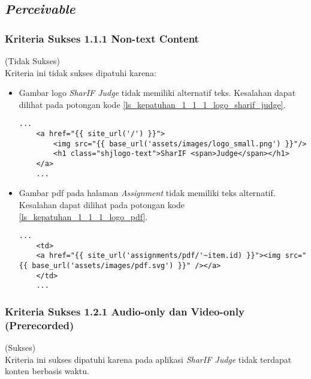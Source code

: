 \subsection{\textit{Perceivable}}
\label{subsec:kepatuhan_perceivable}

\subsubsection{Kriteria Sukses 1.1.1 Non-text Content}
\label{subsubsec:kepatuhan_kriteria_1.1.1}
(Tidak Sukses) \\

Kriteria ini tidak sukses dipatuhi karena:
\begin{itemize}
	\item Gambar logo \textit{SharIF Judge} tidak memiliki alternatif teks. Kesalahan dapat dilihat pada potongan kode \ref{ls_kepatuhan_1_1_1_logo_sharif_judge}.
	\begin{lstlisting}[basicstyle=\ttfamily, frame=single,
	columns=fullflexible, keepspaces=true, breaklines=true, label=ls_kepatuhan_1_1_1_logo_sharif_judge, caption=Kriteria Sukses 1.1.1 - Logo SharIF Judge Tidak Diberi Teks Alternatif]
	...
	<a href="{{ site_url('/') }}">
		<img src="{{ base_url('assets/images/logo_small.png') }}"/>
		<h1 class="shjlogo-text">SharIF <span>Judge</span></h1>
	</a>
	...
	\end{lstlisting}
	\item Gambar pdf pada halaman \textit{Assignment} tidak memiliki teks alternatif. Kesalahan dapat dilihat pada potongan kode \ref{ls_kepatuhan_1_1_1_logo_pdf}.
	\begin{lstlisting}[basicstyle=\ttfamily, frame=single,
	columns=fullflexible, keepspaces=true, breaklines=true, label=ls_kepatuhan_1_1_1_logo_pdf, caption=Kriteria Sukses 1.1.1 - Gambar PDF Tidak Diberi Teks Alternatif]
	...
	<td>
	<a href="{{ site_url('assignments/pdf/'~item.id) }}"><img src="{{ base_url('assets/images/pdf.svg') }}" /></a>
	</td>
	...
	\end{lstlisting}
\end{itemize}

\subsubsection{Kriteria Sukses 1.2.1 Audio-only dan Video-only (Prerecorded)}
\label{subsubsec:kepatuhan_kriteria_1.2.1}
(Sukses) \\

Kriteria ini sukses dipatuhi karena pada aplikasi \textit{SharIF Judge} tidak terdapat konten berbasis waktu.

